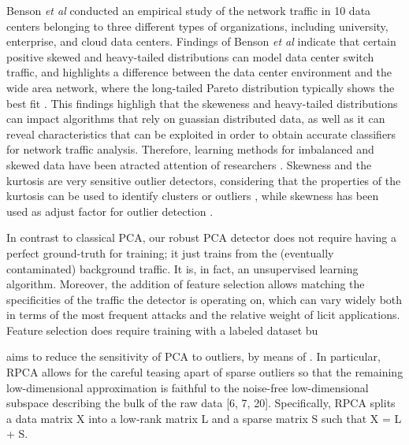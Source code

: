 \documentclass[review]{elsarticle}
\begin{document}
Benson \emph{et al} \cite{benson2010network} conducted an empirical study of the network traffic in 10 data centers belonging to three different types of organizations, including university, enterprise, and cloud data centers. Findings of Benson \emph{et al} indicate that certain positive skewed and heavy-tailed distributions can model data center switch traffic, and highlights a difference between the data center environment and the wide area network, where the long-tailed Pareto distribution typically shows the best fit \cite{benson2010network}. This findings highligh that the skeweness and heavy-tailed distributions can impact algorithms that rely on guassian distributed data, as well as it can reveal characteristics that can be exploited in order to obtain accurate classifiers for network traffic analysis. Therefore, learning methods for imbalanced and skewed data have been atracted attention of researchers \cite{Phua2004minority,hubert2009robustskewed}. Skewness and the kurtosis are very sensitive outlier detectors, considering that the properties of the kurtosis can be used to identify clusters or outliers \cite{pena2010eigenvectors}, while skewness has been used as adjust factor for outlier detection \cite{hubert2009robustskewed}.

In contrast to classical PCA, our robust PCA detector does not require having a perfect ground-truth for training; it just trains from the (eventually contaminated) background traffic. It is, in fact, an unsupervised learning algorithm. Moreover, the addition of feature selection allows matching the specificities of the traffic the detector is operating on, which can vary widely both in terms of the most frequent attacks and the relative weight of licit applications. Feature selection does require training with a labeled dataset bu


aims to reduce the sensitivity of PCA to outliers, by means of . In particular, RPCA allows for the careful teasing apart of sparse outliers so that the remaining low-dimensional approximation is faithful to the noise-free low-dimensional subspace describing the bulk of the raw data [6, 7, 20]. Specifically, RPCA splits a data matrix X into a low-rank matrix L and a sparse matrix S such that
X = L + S.
\end{document}
